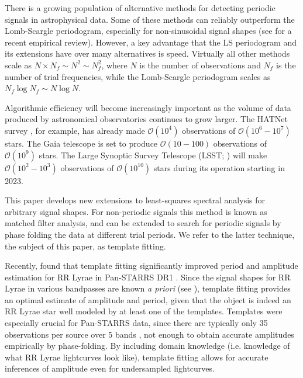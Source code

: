 \documentclass[apj]{emulateapj}
\newcommand{\bigO}{\mathcal{O}}
\begin{document}
There is a growing population of alternative methods for detecting
periodic signals in astrophysical data. Some of these methods can reliably
outperform the Lomb-Scargle periodogram, especially for non-sinusoidal signal shapes
(see \cite{Graham_etal_2013} for a recent empirical review). However, a key advantage
that the LS periodogram and its extensions have over many alternatives is speed.
Virtually all other methods scale as $N\times N_f \sim N^2\sim N_f^2$, where $N$ is the number
of observations and $N_f$ is the number of trial frequencies, while the Lomb-Scargle
periodogram scales as $N_f\log N_f \sim N\log N$.

Algorithmic efficiency will become increasingly important as the volume
of data produced by astronomical observatories continues to grow larger. The HATNet survey 
\citep{Bakos_etal_2004}, for example, has already made $\bigO(10^4)$ observations of 
$\bigO(10^6-10^7)$ stars. The Gaia telescope \citep{GAIA} is set to produce $\bigO(10-100)$ 
observations of $\bigO(10^9)$ stars. The Large Synoptic Survey Telescope (LSST; \cite{LSST}) 
will make $\bigO(10^2-10^3)$ observations of $\bigO(10^{10})$ stars during its operation starting in 2023.

This paper develops new extensions to least-squares spectral analysis for arbitrary
signal shapes. For non-periodic signals this method is known as matched filter analysis,
and can be extended to search for periodic signals by phase folding the data
at different trial periods. We refer to the latter technique, the subject of this paper, as
template fitting. 

Recently, \cite{Sesar_etal_2016} found that template fitting significantly improved
period and amplitude estimation for RR Lyrae in Pan-STARRS DR1 \citep{PanSTARRS}. Since the signal
shapes for RR Lyrae in various bandpasses are known \emph{a priori} (see \cite{Sesar_etal_2010}), 
template fitting provides an optimal estimate of amplitude and period,
given that the object is indeed an RR Lyrae star well modeled by at least one of the templates. 
Templates were especially crucial for Pan-STARRS data, since there are typically only 
35 observations per source over 5 bands \citep{Hernitschek_etal_2016}, not enough to obtain 
accurate amplitudes empirically by phase-folding. By including domain knowledge (i.e. knowledge of what RR Lyrae 
lightcurves look like), template fitting allows for accurate inferences of amplitude even 
for undersampled lightcurves.
\end{document}
